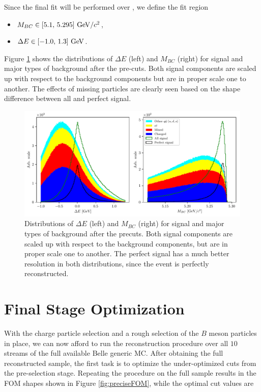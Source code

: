 Since the final fit will be performed over \vars, we define the fit region
\begin{itemize}
	\item $M_{BC} \in [5.1,\,5.295]\mathrm{~GeV}/c^2$,
	\item $\Delta E \in [-1.0,\,1.3]\mathrm{~GeV}$.
\end{itemize}

Figure \ref{fig:mbc_de_pre} shows the distributions of $\Delta E$ (left) and $M_{BC}$ (right) for signal and major types of background after the pre-cuts. Both signal components are scaled up with respect to the background components but are in proper scale one to another. The effects of missing particles are clearly seen based on the shape difference between all and perfect signal.

\begin{figure}[H]
	\centering
	\captionsetup{width=0.8\linewidth}
	\includegraphics[width=\linewidth]{fig/mbc_de_pre}
	\caption{Distributions of $\Delta E$ (left) and $M_{BC}$ (right) for signal and major types of background after the precuts. Both signal components are scaled up with respect to the background components, but are in proper scale one to another. The perfect signal has a much better resolution in both distributions, since the event is perfectly reconstructed.}
	\label{fig:mbc_de_pre}
\end{figure}

\section{Final Stage Optimization}

With the charge particle selection and a rough selection of the $B$ meson particles in place, we can now afford to run the reconstruction procedure over all $10$ streams of the full available Belle generic MC. After obtaining the full reconstructed sample, the first task is to optimize the under-optimized cuts from the pre-selection stage. Repeating the procedure on the full sample results in the FOM shapes shown in Figure \ref{fig:preciseFOM}, while the optimal cut values are

